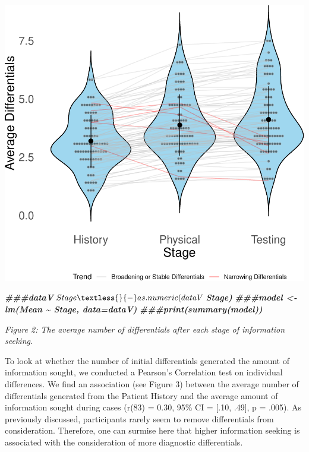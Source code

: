 \documentclass[a4paper, nobind]{templates/ociamthesis}
\newenvironment{Shaded}{\begin{snugshade}}{\end{snugshade}}
\newcommand{\DocumentationTok}[1]{\textcolor[rgb]{0.56,0.35,0.01}{\textbf{\textit{#1}}}}
\renewenvironment{Shaded}
{
  \vspace{10pt}%
  \begin{snugshade}%
}{%
  \end{snugshade}%
  \vspace{8pt}%
}
\begin{document}
\includegraphics{_main_files/figure-latex/diffsOverStages-1.pdf}

\begin{Shaded}
\begin{Highlighting}[]
\DocumentationTok{\#\#\#dataV$Stage \textless{}{-} as.numeric(dataV$Stage)}
\DocumentationTok{\#\#\#model \textless{}{-} lm(Mean \textasciitilde{} Stage, data=dataV)}
\DocumentationTok{\#\#\#print(summary(model))}
\end{Highlighting}
\end{Shaded}

\emph{Figure 2: The average number of differentials after each stage of information seeking.}

To look at whether the number of initial differentials generated the amount of information sought, we conducted a Pearson's Correlation test on individual differences. We find an association (see Figure 3) between the average number of differentials generated from the Patient History and the average amount of information sought during cases (r(83) = 0.30, 95\% CI = {[}.10, .49{]}, p = .005). As previously discussed, participants rarely seem to remove differentials from consideration. Therefore, one can surmise here that higher information seeking is associated with the consideration of more diagnostic differentials.
\end{document}
